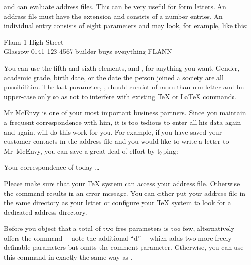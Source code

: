 \begin{Declaration}
\end{Declaration}%
 and  can evaluate address files.
This can be very useful for form letters. An address file must have the
extension  and consists of a number  entries.
An individual entry consists of eight parameters and may look, for example,
like this:
\begin{lstcode}
           {Flann}
           {1 High Street\\ Glasgow}
           {0141 123 4567}
           {builder}
           {}
           {buys everything}
           {FLANN}
\end{lstcode}
You can use the fifth and sixth elements,  and , for
anything you want. Gender, academic grade, birth date, or the date the person
joined a society are all possibilities. The last parameter, ,
should consist of more than one letter and be upper-case only so as not to
interfere with existing \TeX{} or \LaTeX{} commands.

\begin{Example}
  Mr McEnvy is one of your most important business partners. Since you
  maintain a frequent correspondence with him, it is too tedious to
  enter all his data again and again. \KOMAScript{} will do this work for you.
  For example, if you have saved your customer contacts in the
   address file and you would like to write a letter to
  Mr~McEnvy, you can save a great deal of effort by typing:
  \begin{lstcode}
    
    \begin{letter}{\FLANN}
      Your correspondence of today \dots
    \end{letter}
  \end{lstcode}
  Please make sure that your {\TeX} system can access your address file.
  Otherwise the  command results in an error message. You can
  either put your address file in the same directory as your letter or
  configure your \TeX{} system to look for a dedicated address directory.
\end{Example}
% 
\EndIndexGroup


\begin{Declaration}
\end{Declaration}%
Before you object that a total of two free parameters is too few,
\KOMAScript{} alternatively offers the  command\,---\,note
the additional ``d''\,---\,which adds two more freely definable parameters but
omits the comment parameter. Otherwise, you can use this command in exactly
the same way as .

